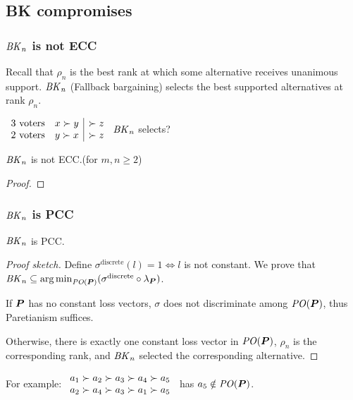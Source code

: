\documentclass[french, english]{beamer}
\begin{document}
\subsection{BK compromises}
\begin{frame}
	\frametitle{$\BK[n]$ is not ECC}
	Recall that $\rho_n$ is the best rank at which some alternative receives unanimous support. $\BK[n]$ (Fallback bargaining) selects the best supported alternatives at rank $\rho_n$.
	\begin{example}[${\BK[n]}$]
		$\begin{array}{rl|l}
			3 \text{ voters} & x \pref y &\pref z\\%
			2 \text{ voters} & y \pref x &\pref z\\%
		\end{array}$
		\hspace{2cm} $\BK[n]$ selects? \onslide<2>{$\set{x, y}$}
	\end{example}
	\begin{theorem}
		$\BK[n]$ is not ECC.\hfill {\small (for $m, n ≥ 2$)}
	\end{theorem}
	\begin{proof}
		\onslide<2>{$\BK[n]$ is Paretian.}
	\end{proof}
\end{frame}

\begin{frame}
	\frametitle{$\BK[n]$ is PCC}
	\begin{theorem}
		$\BK[n]$ is PCC.
	\end{theorem}
	\begin{proof}[Proof sketch]
		Define $\sigma^\text{discrete}(l) = 1 ⇔ l$ is not constant.
		We prove that $\BK[n] \subseteq \argmin_{\PO(\prof)} (\sigma^\text{discrete} \circ \lprof)$.

		If $\boldsymbol{P}$ has no constant loss vectors, $\sigma$ does not discriminate among $\mathit{PO}(\boldsymbol{P})$, thus Paretianism suffices.

		Otherwise, there is exactly one constant loss vector in $\mathit{PO}(\boldsymbol{P})$, $\rho_n$ is the corresponding rank, and $\BK[n]$ selected the corresponding alternative.
	\end{proof}
	For example: 
		$\begin{array}{l}
			a_1 \succ a_2 \succ a_3 \succ a_4 \succ a_5\\
			a_2 \succ a_4 \succ a_3 \succ a_1 \succ a_5\\
		\end{array}$
		has $a_5 \notin \mathit{PO}(\boldsymbol{P})$.
\end{frame}
\end{document}
